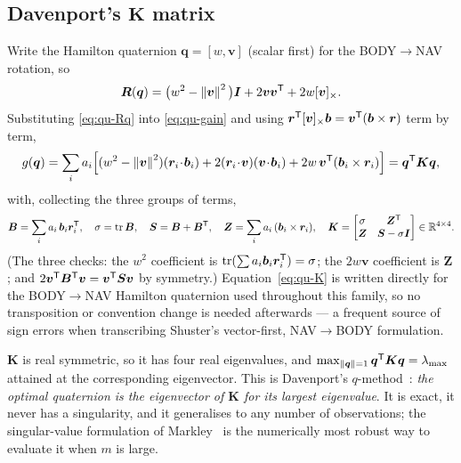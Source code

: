 \subsection{Davenport's \texorpdfstring{$\bm{K}$}{K} matrix}
Write the Hamilton quaternion $\bm{q}=[w,\bm{v}]$ (scalar first) for the BODY$\to$NAV rotation, so
\begin{equation}
\bm{R}(\bm{q}) = \big(w^2-\left\lVert \bm{v} \right\rVert^2\big)\bm{I} + 2\bm{v}\bm{v}^{\mathsf{T}} + 2w[\bm{v}]_\times .
\label{eq:qu-Rq}
\end{equation}
Substituting \eqref{eq:qu-Rq} into \eqref{eq:qu-gain} and using
$\bm{r}^{\mathsf{T}}[\bm{v}]_\times\bm{b}=\bm{v}^{\mathsf{T}}(\bm{b}\times\bm{r})$ term by term,
\begin{equation}
g(\bm{q}) = \sum_i a_i\Big[(w^2-\left\lVert \bm{v} \right\rVert^2)(\bm{r}_i\!\cdot\!\bm{b}_i)
 + 2(\bm{r}_i\!\cdot\!\bm{v})(\bm{v}\!\cdot\!\bm{b}_i)
 + 2w\,\bm{v}^{\mathsf{T}}(\bm{b}_i\times\bm{r}_i)\Big]
 = \bm{q}^{\mathsf{T}}\bm{K}\bm{q} ,
\label{eq:qu-quad}
\end{equation}
with, collecting the three groups of terms,
\begin{equation}
\bm{B}=\sum_i a_i\,\bm{b}_i\bm{r}_i^{\mathsf{T}},\quad
\sigma=\operatorname{tr}\bm{B},\quad
\bm{S}=\bm{B}+\bm{B}^{\mathsf{T}},\quad
\bm{Z}=\sum_i a_i\,(\bm{b}_i\times\bm{r}_i),\quad
\bm{K}=\begin{bmatrix}\sigma & \bm{Z}^{\mathsf{T}}\\ \bm{Z} & \bm{S}-\sigma\bm{I}\end{bmatrix}\in\mathbb{R}^{4\times4}.
\label{eq:qu-K}
\end{equation}
(The three checks: the $w^2$ coefficient is $\operatorname{tr}(\sum a_i\bm{b}_i\bm{r}_i^{\mathsf{T}})=\sigma$; the $2w\bm{v}$
coefficient is $\bm{Z}$; and $2\bm{v}^{\mathsf{T}}\bm{B}^{\mathsf{T}}\bm{v}=\bm{v}^{\mathsf{T}}\bm{S}\bm{v}$ by symmetry.)
Equation~\eqref{eq:qu-K} is written directly for the BODY$\to$NAV Hamilton quaternion used
throughout this family, so no transposition or convention change is needed afterwards --- a
frequent source of sign errors when transcribing Shuster's vector-first, NAV$\to$BODY formulation.

$\bm{K}$ is real symmetric, so it has four real eigenvalues, and
$\max_{\left\lVert \bm{q} \right\rVert=1}\bm{q}^{\mathsf{T}}\bm{K}\bm{q}=\lambda_{\max}$ attained at the corresponding
eigenvector. This is Davenport's $q$-method~\cite{keat1977}: \emph{the optimal quaternion is the
eigenvector of $\bm{K}$ for its largest eigenvalue}. It is exact, it never has a singularity, and it
generalises to any number of observations; the singular-value formulation of
Markley~\cite{markley1988} is the numerically most robust way to evaluate it when $m$ is large.

